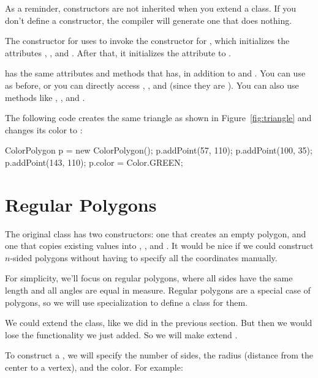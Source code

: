 As a reminder, constructors are not inherited when you extend a class.
If you don't define a constructor, the compiler will generate one that does nothing.

The constructor for  uses  to invoke the constructor for , which initializes the attributes , , and .
After that, it initializes the  attribute to .

 has the same attributes and methods that  has, in addition to  and .
You can use  as before, or you can directly access , , and  (since they are ).
You can also use methods like , , and .

The following code creates the same triangle as shown in Figure~\ref{fig:triangle} and changes its color to :

\begin{code}
ColorPolygon p = new ColorPolygon();
p.addPoint(57, 110);
p.addPoint(100, 35);
p.addPoint(143, 110);
p.color = Color.GREEN;
\end{code}


\section{Regular Polygons}

The original  class has two constructors: one that creates an empty polygon, and one that copies existing values into , , and .
It would be nice if we could construct $n$-sided polygons without having to specify all the coordinates manually.

For simplicity, we'll focus on regular polygons, where all sides have the same length and all angles are equal in measure.
Regular polygons are a special case of polygons, so we will use specialization to define a class for them.

We could extend the  class, like we did in the previous section.
But then we would lose the  functionality we just added.
So we will make  extend .

To construct a , we will specify the number of sides, the radius (distance from the center to a vertex), and the color.
For example:

